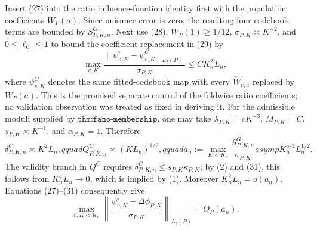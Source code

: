 Insert (27) into the ratio influence-function identity first with the population coefficients \(W_P(a)\).  Since nuisance error is zero, the resulting four codebook terms are bounded by \(S^G_{P,K,n}\).  Next use (28), \(W_P(1)\geq1/12\), \(\sigma_{P,K}\asymp K^{-2}\), and \(0\leq\ell_C\leq1\) to bound the coefficient replacement in (29) by
\[
 \max_{v,K}\frac{\|\psi_{v,K}^{\circ}-\psi_{v,K}^{C}\|_{L_2(P)}}{\sigma_{P,K}}
 \leq CK_n^2L_n,                                                              \tag{30}
\]
where \(\psi_{v,K}^{C}\) denotes the same fitted-codebook map with every \(\check W_{v,a}\) replaced by \(W_P(a)\).  This is the promised separate control of the foldwise ratio coefficients; no validation observation was treated as fixed in deriving it.  For the admissible moduli supplied by \(\texttt{thm:fano-membership}\), one may take \(\lambda_{P,K}=cK^{-3}\), \(M_{P,K}=C\), \(s_{P,K}\asymp K^{-1}\), and \(\alpha_{P,K}=1\).  Therefore
\[
 \delta^C_{P,K,n}\asymp K^2L_n,qquad
 Q^C_{P,K,n}\asymp(KL_n)^{1/2},qquad
 a_n:=\max_{K<K_n}\frac{S^G_{P,K,n}}{\sigma_{P,K}}asymp K_n^{5/2}L_n^{1/2}.  \tag{31}
\]
The validity branch in \(Q^C\) requires \(\delta^C_{P,K,n}\leq s_{P,K}\kappa_{P,K}\); by (2) and (31), this follows from \(K_n^4L_n\to0\), which is implied by (1).  Moreover \(K_n^2L_n=o(a_n)\).  Equations (27)--(31) consequently give
\[
 \max_{v,K<K_n}\left\|
 \frac{\psi_{v,K}^{\circ}-\Delta\phi_{P,K}}{\sigma_{P,K}}
 \right\|_{L_2(P)}=O_P(a_n).                                                  \tag{32}
\]

